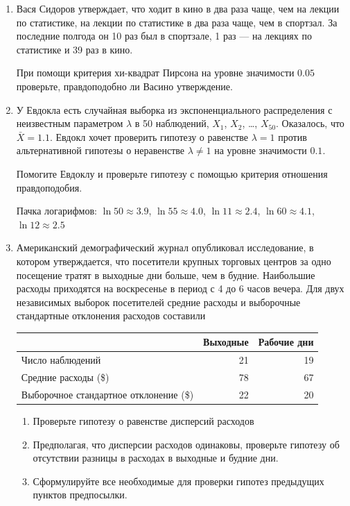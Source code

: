 \documentclass[12pt, a4paper]{article}\usepackage[]{graphicx}\usepackage[]{color}
\begin{document}
\begin{enumerate}
							\item	Вася Сидоров утверждает, что ходит в кино в два раза чаще, чем на лекции по статистике, на лекции по статистике в два раза чаще, чем в спортзал. За последние полгода он 10 раз был в спортзале, 1 раз — на лекциях по статистике и 39 раз в кино.

							При помощи критерия хи-квадрат Пирсона на уровне значимости $0.05$ проверьте, правдоподобно ли Васино утверждение.

							\item У Евдокла есть случайная выборка из экспоненциального распределения с неизвестным параметром $\lambda$ в 50 наблюдений, $X_1$, $X_2$, \ldots, $X_{50}$. Оказалось, что $\bar X = 1.1$. Евдокл хочет проверить гипотезу о равенстве $\lambda = 1$ против альтернативной гипотезы о неравенстве $\lambda \neq 1$ на уровне значимости $0.1$.

							Помогите Евдоклу и проверьте гипотезу с помощью критерия отношения правдоподобия.

							Пачка логарифмов: $\ln 50 \approx 3.9$, $\ln 55 \approx 4.0$, $\ln 11 \approx 2.4$, $\ln 60 \approx 4.1$, $\ln 12 \approx 2.5$


							\item Американский демографический журнал опубликовал исследование, в котором утверждается, что посетители крупных торговых центров за одно посещение тратят  в выходные дни больше, чем в будние. Наибольшие расходы приходятся на воскресенье в период с 4 до 6 часов вечера. Для двух независимых выборок посетителей средние расходы и выборочные стандартные отклонения расходов составили

							\begin{tabular}{lrr}
								\toprule
								& Выходные & Рабочие дни \\
								\midrule
								Число наблюдений & 21 & 19 \\
								Средние расходы (\$) & 78 & 67 \\
								Выборочное стандартное отклонение (\$) & 22 & 20 \\
								\bottomrule
							\end{tabular}


							\begin{enumerate}
								\item Проверьте гипотезу о равенстве дисперсий расходов
								\item Предполагая, что дисперсии расходов одинаковы, проверьте гипотезу об отсутствии разницы в расходах в выходные и будние дни.
								\item Сформулируйте все необходимые для проверки гипотез предыдущих пунктов предпосылки.
							\end{enumerate}




\end{enumerate}
\end{document}
